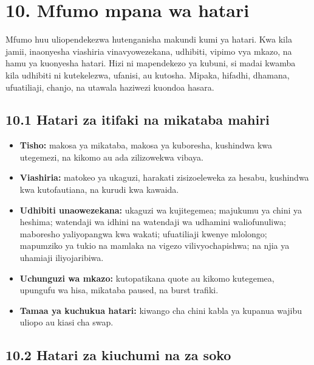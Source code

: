 \documentclass[11pt]{article}
\begin{document}
\section*{10. Mfumo mpana wa hatari}

Mfumo huu uliopendekezwa hutenganisha makundi kumi ya hatari. Kwa kila jamii, inaonyesha viashiria vinavyowezekana, udhibiti, vipimo vya mkazo, na hamu ya kuonyesha hatari. Hizi ni mapendekezo ya kubuni, si madai kwamba kila udhibiti ni kutekelezwa, ufanisi, au kutosha. Mipaka, hifadhi, dhamana, ufuatiliaji, chanjo, na utawala haziwezi kuondoa hasara.

\subsection*{10.1 Hatari za itifaki na mikataba mahiri}

\begin{itemize}[leftmargin=*]
\item \textbf{Tisho:} makosa ya mikataba, makosa ya kuboresha, kushindwa kwa utegemezi, na kikomo au ada zilizowekwa vibaya.
\item \textbf{Viashiria:} matokeo ya ukaguzi, harakati zisizoeleweka za hesabu, kushindwa kwa kutofautiana, na kurudi kwa kawaida.
\item \textbf{Udhibiti unaowezekana:} ukaguzi wa kujitegemea; majukumu ya chini ya heshima; watendaji wa idhini na watendaji wa udhamini waliofunuliwa; maboresho yaliyopangwa kwa wakati; ufuatiliaji kwenye mlolongo; mapumziko ya tukio na mamlaka na vigezo vilivyochapishwa; na njia ya uhamiaji iliyojaribiwa.
\item \textbf{Uchunguzi wa mkazo:} kutopatikana quote au kikomo kutegemea, upungufu wa hisa, mikataba paused, na burst trafiki.
\item \textbf{Tamaa ya kuchukua hatari:} kiwango cha chini kabla ya kupanua wajibu uliopo au kiasi cha swap.
\end{itemize}
\subsection*{10.2 Hatari za kiuchumi na za soko}
\end{document}
